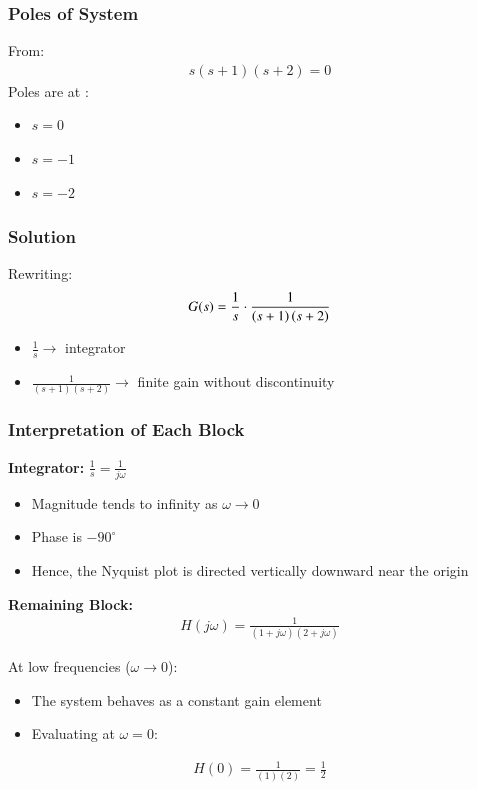 \documentclass{beamer}
\begin{document}
\begin{frame}
    \frametitle{Poles of System}
    From:
    \begin{align}
        s(s+1)(s+2) = 0 
    \end{align}
    Poles are at :
    \begin{itemize}
        \item $s = 0$
        \item $s = -1$
        \item $s = -2$ 
    \end{itemize}
\end{frame}

\begin{frame}
    \frametitle{Solution}
    Rewriting: 
    \begin{align}
        G(s) = \frac{1}{s}\cdot\frac{1}{\left(s+1\right)\left(s+2\right)}
    \end{align}

    \begin{itemize}
        \item $\frac{1}{s} \rightarrow $ integrator
        \item $\frac{1}{(s+1)(s+2)}  \rightarrow $ finite gain without discontinuity
    \end{itemize}

\end{frame}

\begin{frame}
\frametitle{Interpretation of Each Block}

\textbf{Integrator:} $\frac{1}{s} = \frac{1}{j\omega}$
\begin{itemize}
    \item Magnitude tends to infinity as $\omega \to 0$
    \item Phase is $-90^\circ$
    \item Hence, the Nyquist plot is directed vertically downward near the origin
\end{itemize}

\vspace{0.5cm}

\textbf{Remaining Block:}
\begin{align}
    H(j\omega) = \frac{1}{(1 + j\omega)(2 + j\omega)}
\end{align}

At low frequencies ($\omega \to 0$):
\begin{itemize}
    \item The system behaves as a constant gain element
    \item Evaluating at $\omega = 0$:
\end{itemize}

\begin{align}
    H(0) = \frac{1}{(1)(2)} = \frac{1}{2}
\end{align}

\end{frame}
\end{document}
